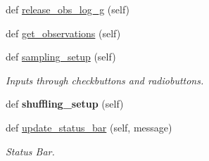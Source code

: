 \begin{DoxyCompactItemize}
def \hyperlink{classasamba_1_1frontend__orig_1_1_g_u_i_a23fecf5b0f52f4b0c420118e8572c435}{release\+\_\+obs\+\_\+log\+\_\+g} (self)
\item 
def \hyperlink{classasamba_1_1frontend__orig_1_1_g_u_i_a2115a025361cf5282c72baef51ec0004}{get\+\_\+observations} (self)
\item 
\mbox{\label{classasamba_1_1frontend__orig_1_1_g_u_i_acd2f0daae2ef040bed9c496df0063cf6}} 
def \hyperlink{classasamba_1_1frontend__orig_1_1_g_u_i_acd2f0daae2ef040bed9c496df0063cf6}{sampling\+\_\+setup} (self)
\begin{DoxyCompactList}\small\item\em Inputs through checkbuttons and radiobuttons. \end{DoxyCompactList}\item 
\mbox{\label{classasamba_1_1frontend__orig_1_1_g_u_i_a0c1d59a9980bfd581ba746733429d620}} 
def {\bfseries shuffling\+\_\+setup} (self)
\item 
def \hyperlink{classasamba_1_1frontend__orig_1_1_g_u_i_a630301b7e934776f232fcb4562974ae9}{update\+\_\+status\+\_\+bar} (self, message)
\begin{DoxyCompactList}\small\item\em Status Bar. \end{DoxyCompactList}\end{DoxyCompactItemize}
